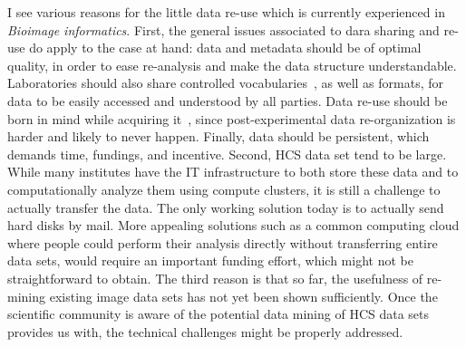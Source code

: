 I see various reasons for the little data re-use which is currently experienced in \textit{Bioimage informatics}. First, the general issues associated to dara sharing and re-use do apply to the case at hand: data and metadata should be of optimal quality, in order to ease re-analysis and make the data structure understandable. Laboratories should also share controlled vocabularies~\cite{pmid18603566}, as well as formats, for data to be easily accessed and understood by all parties. Data re-use should be born in mind while acquiring it~\cite{pmid23047157}, since post-experimental data re-organization is harder and likely to never happen. %
Finally, data should be persistent, which demands time, fundings, and incentive.  %
Second, HCS data set tend to be large. While many institutes have the IT infrastructure to both store these data and to computationally analyze them using compute clusters, it is still a challenge to actually transfer the data. The only working solution today is to actually send hard disks by mail. More appealing solutions such as a common computing cloud where people could perform their analysis directly without transferring entire data sets, would require an important funding effort, which might not be straightforward to obtain. The third reason is that so far, the usefulness of re-mining existing image data sets has not yet been shown sufficiently. Once the scientific community is aware of the potential data mining of HCS data sets provides us with, the technical challenges might be properly addressed. 

